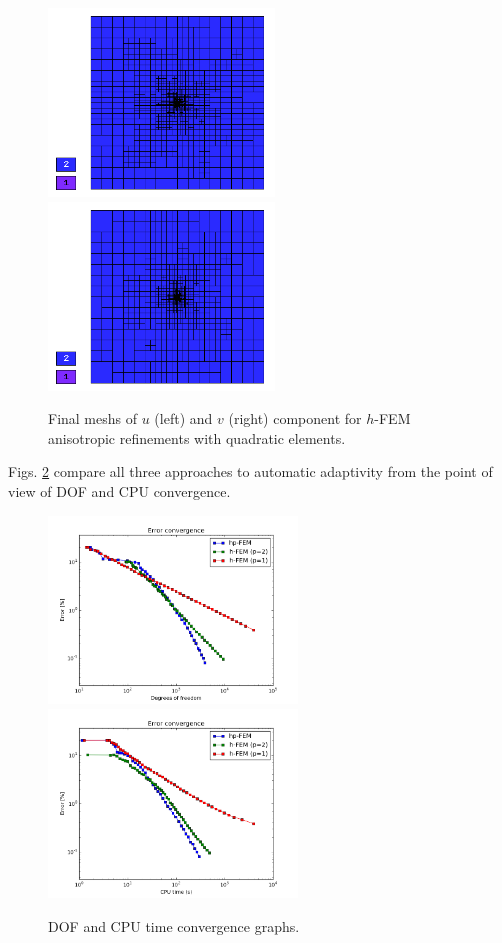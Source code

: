 \begin{figure}[!ht]
\centering
\includegraphics[height=5cm]{nist/nist-3/mesh_u_h2_aniso.png}\ \
\includegraphics[height=5cm]{nist/nist-3/mesh_v_h2_aniso.png}
\caption{Final meshs of $u$ (left) and $v$ (right) component for $h$-FEM anisotropic refinements with quadratic elements.}
\label{fig:nist-3-h2-aniso}
\end{figure}

Figs. \ref{fig:nist-3-conv} compare all
three approaches to automatic adaptivity from the point
of view of DOF and CPU convergence.

\begin{figure}[!ht]
\centering
\includegraphics[height=5cm]{nist/nist-3/conv_dof_aniso.png}\ \
\includegraphics[height=5cm]{nist/nist-3/conv_cpu_aniso.png}
\caption{DOF and CPU time convergence graphs.}
\label{fig:nist-3-conv}
\end{figure}

